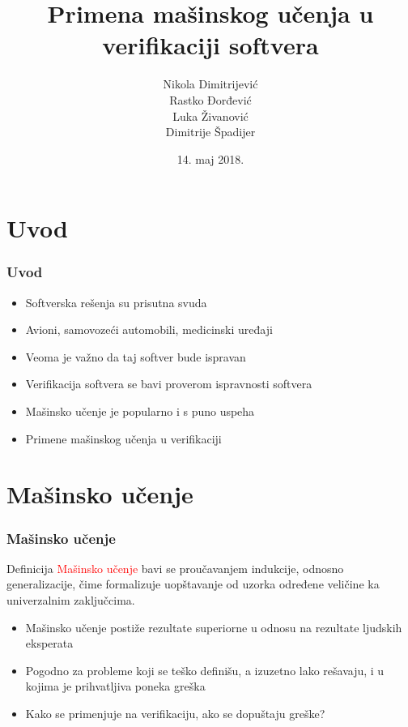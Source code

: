 \documentclass[11pt]{beamer}
\title{Primena mašinskog učenja u verifikaciji softvera}
\author[\hspace{-0.8em}N. Dimitrijević, R. Đorđević, L. Živanović, D. Špadijer]
		{Nikola Dimitrijević\\ %
        Rastko Đorđević\\ %
        Luka Živanović\\ %
        Dimitrije Špadijer} %
\date{14. maj 2018.}
\theoremstyle{definition}
\begin{document}
\begin{frame}
\titlepage
\end{frame}

\section[]{Uvod}
\label{sec:uvod}
\begin{frame}
\frametitle{Uvod}
\begin{itemize}
\item Softverska rešenja su prisutna svuda
\item Avioni, samovozeći automobili, medicinski uređaji
\item Veoma je važno da taj softver bude ispravan
\item Verifikacija softvera se bavi proverom ispravnosti softvera
\item Mašinsko učenje je popularno i s puno uspeha
\item Primene mašinskog učenja u verifikaciji
\end{itemize}
\end{frame}

\section{Mašinsko učenje}

\begin{frame}
\frametitle{Mašinsko učenje}

\begin{block}{Definicija}
\textcolor{red}{Mašinsko učenje} bavi se proučavanjem indukcije, odnosno generalizacije, čime formalizuje uopštavanje od uzorka određene veličine ka univerzalnim zaključcima.
\end{block}

\begin{itemize}
\item Mašinsko učenje postiže rezultate superiorne u odnosu na rezultate ljudskih eksperata
\item Pogodno za probleme koji se teško definišu, a izuzetno lako rešavaju, i u kojima je prihvatljiva poneka greška
\item Kako se primenjuje na verifikaciju, ako se dopuštaju greške?
\end{itemize}
\end{frame}
\end{document}
